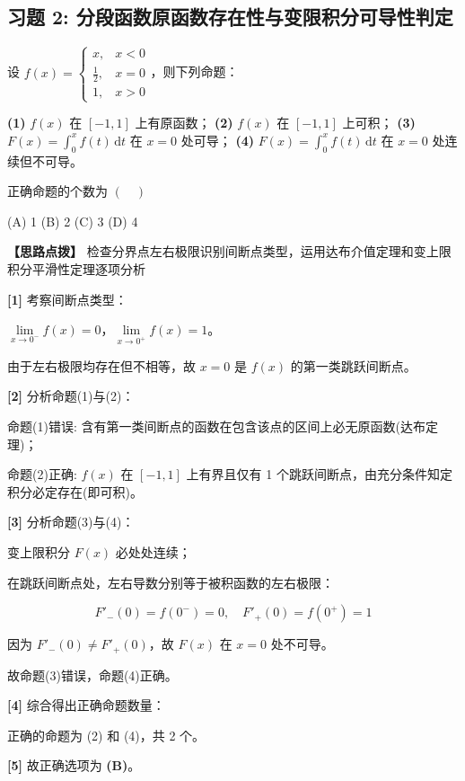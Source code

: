 \documentclass[11pt,a4paper,UTF8]{ctexart}
\begin{document}
\subsection{习题 2: 分段函数原函数存在性与变限积分可导性判定}

设 $f(x) = \begin{cases} x, & x < 0 \\ \frac{1}{2}, & x = 0 \\ 1, & x > 0 \end{cases}$，则下列命题：

\textbf{(1)}  $f(x)$ 在 $[-1, 1]$ 上有原函数；
\textbf{(2)}  $f(x)$ 在 $[-1, 1]$ 上可积；
\textbf{(3)}  $F(x) = \int_0^x f(t)\,\mathrm{d}t$ 在 $x=0$ 处可导；
\textbf{(4)}  $F(x) = \int_0^x f(t)\,\mathrm{d}t$ 在 $x=0$ 处连续但不可导。

正确命题的个数为 $(\quad)$

(A) 1 \qquad (B) 2 \qquad (C) 3 \qquad (D) 4

\textbf{\color{DeepPurple}【思路点拨】} 检查分界点左右极限识别间断点类型，运用达布介值定理和变上限积分平滑性定理逐项分析


\begin{solbox}[分步推导与答题规范]
\textbf{[1]} 考察间断点类型：

$\lim\limits_{x \to 0^-} f(x) = 0$，$\lim\limits_{x \to 0^+} f(x) = 1$。

由于左右极限均存在但不相等，故 $x = 0$ 是 $f(x)$ 的第一类跳跃间断点。

\textbf{[2]} 分析命题(1)与(2)：

命题(1)错误: 含有第一类间断点的函数在包含该点的区间上必无原函数(达布定理)；

命题(2)正确: $f(x)$ 在 $[-1, 1]$ 上有界且仅有 1 个跳跃间断点，由充分条件知定积分必定存在(即可积)。

\textbf{[3]} 分析命题(3)与(4)：

变上限积分 $F(x)$ 必处处连续；

在跳跃间断点处，左右导数分别等于被积函数的左右极限：


\begin{equation*}
F'_-(0) = f(0^-) = 0, \quad F'_+(0) = f(0^+) = 1
\end{equation*}


因为 $F'_-(0) \neq F'_+(0)$，故 $F(x)$ 在 $x = 0$ 处不可导。

故命题(3)错误，命题(4)正确。

\textbf{[4]} 综合得出正确命题数量：

正确的命题为 (2) 和 (4)，共 2 个。

\textbf{[5]} 故正确选项为 \textbf{(B)}。
\end{solbox}
\end{document}
